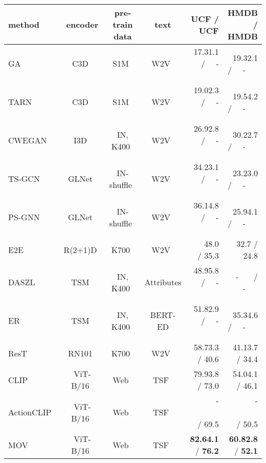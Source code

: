 \documentclass{article}
\begin{document}
\begin{table}[t]
\centering
\footnotesize	
\begin{tabular}{lcccrr}
\toprule 
method & encoder & pre-train data & text & UCF / UCF & HMDB / HMDB \\
\midrule
GA~\cite{mishra2018generative} & C3D~\cite{tran2015learning} & S1M~\cite{karpathy2014large} & W2V~\cite{mikolov2013efficient} & 17.31.1 / ~~-~~~ &  19.32.1 / ~~-~~~ \\
TARN~\cite{bishay2019tarn} & C3D~\cite{tran2015learning} & S1M~\cite{karpathy2014large} & W2V~\cite{mikolov2013efficient} & 19.02.3 / ~~-~~~ & 19.54.2 / ~~-~~~ \\
CWEGAN~\cite{mandal2019out} & I3D~\cite{carreira2017quo} & IN, K400~\cite{kay2017kinetics} & W2V~\cite{mikolov2013efficient} & 26.92.8 / ~~-~~~ & 30.22.7 / ~~-~~~ \\
TS-GCN~\cite{gao2019know} & GLNet~\cite{szegedy2015going} & IN-shuffle~\cite{mettes2016imagenet} & W2V~\cite{mikolov2013efficient} & 34.23.1 / ~~-~~~ & 23.23.0 / ~~-~~~ \\
PS-GNN~\cite{gao2020learning} & GLNet~\cite{szegedy2015going} & IN-shuffle~\cite{mettes2016imagenet} & W2V~\cite{mikolov2013efficient} & 36.14.8 / ~~-~~~ & 25.94.1 / ~~-~~~ \\
E2E~\cite{brattoli2020rethinking} & R(2+1)D~\cite{tran2018closer} & K700~\cite{carreira2019short} & W2V~\cite{mikolov2013efficient} & ~~48.0 / 35.3 & ~~32.7 / 24.8 \\
DASZL~\cite{kim2021daszl} & TSM~\cite{lin2019temporal} & IN, K400~\cite{kay2017kinetics} & Attributes & 48.95.8 / ~~-~~~ & ~~-~~~ / ~~-~~~ \\
ER~\cite{chen2021elaborative} & TSM~\cite{lin2019temporal} & IN, K400~\cite{kay2017kinetics} & BERT-ED & 51.82.9 / ~~-~~~ & 35.34.6 / ~~-~~~ \\
ResT~\cite{lin2022cross} & RN101~\cite{he2016deep} & K700~\cite{carreira2019short} & W2V~\cite{mikolov2013efficient} & 58.73.3 / 40.6 & 41.13.7 / 34.4 \\
\hdashline
CLIP~\cite{radford2021learning} & ViT-B/16~\cite{dosovitskiy2020image} & Web~\cite{radford2021learning} & TSF~\cite{vaswani2017attention} & 79.93.8 / 73.0 & 54.04.1 / 46.1 \\
ActionCLIP~\cite{wang2021actionclip} & ViT-B/16~\cite{dosovitskiy2020image} & Web~\cite{radford2021learning} & TSF~\cite{vaswani2017attention} & ~~-~~~~~~ / 69.5 & ~~-~~~~~~  / 50.5 \\
MOV & ViT-B/16~\cite{dosovitskiy2020image} & Web~\cite{radford2021learning} & TSF~\cite{vaswani2017attention} & \textbf{82.64.1} / \textbf{76.2} & \textbf{60.82.8} / \textbf{52.1}  \\

\end{tabular}
\end{table}
\end{document}

